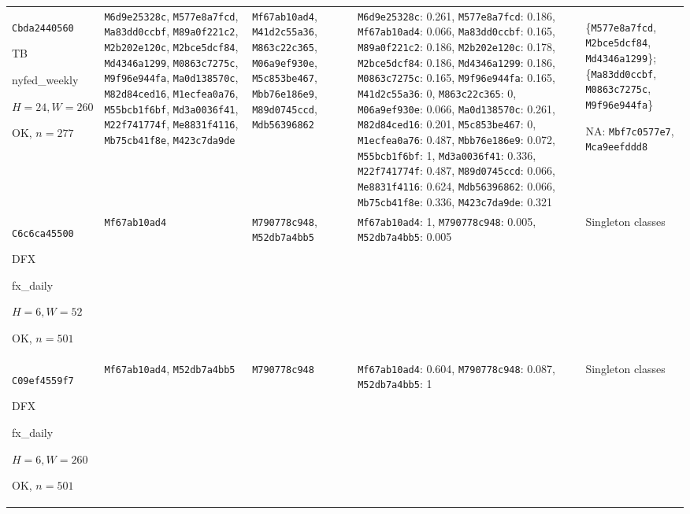 \begin{longtable}{p{.15\linewidth}p{.17\linewidth}p{.17\linewidth}p{.25\linewidth}p{.14\linewidth}}
\texttt{Cbda2440560}\par TB\par nyfed\_\allowbreak{}weekly\par $H=24,W=260$\par OK, $n=277$ & \texttt{M6d9e25328c}, \texttt{M577e8a7fcd}, \texttt{Ma83dd0ccbf}, \texttt{M89a0f221c2}, \texttt{M2b202e120c}, \texttt{M2bce5dcf84}, \texttt{Md4346a1299}, \texttt{M0863c7275c}, \texttt{M9f96e944fa}, \texttt{Ma0d138570c}, \texttt{M82d84ced16}, \texttt{M1ecfea0a76}, \texttt{M55bcb1f6bf}, \texttt{Md3a0036f41}, \texttt{M22f741774f}, \texttt{Me8831f4116}, \texttt{Mb75cb41f8e}, \texttt{M423c7da9de} & \texttt{Mf67ab10ad4}, \texttt{M41d2c55a36}, \texttt{M863c22c365}, \texttt{M06a9ef930e}, \texttt{M5c853be467}, \texttt{Mbb76e186e9}, \texttt{M89d0745ccd}, \texttt{Mdb56396862} & \texttt{M6d9e25328c}: 0.261, \texttt{M577e8a7fcd}: 0.186, \texttt{Mf67ab10ad4}: 0.066, \texttt{Ma83dd0ccbf}: 0.165, \texttt{M89a0f221c2}: 0.186, \texttt{M2b202e120c}: 0.178, \texttt{M2bce5dcf84}: 0.186, \texttt{Md4346a1299}: 0.186, \texttt{M0863c7275c}: 0.165, \texttt{M9f96e944fa}: 0.165, \texttt{M41d2c55a36}: 0, \texttt{M863c22c365}: 0, \texttt{M06a9ef930e}: 0.066, \texttt{Ma0d138570c}: 0.261, \texttt{M82d84ced16}: 0.201, \texttt{M5c853be467}: 0, \texttt{M1ecfea0a76}: 0.487, \texttt{Mbb76e186e9}: 0.072, \texttt{M55bcb1f6bf}: 1, \texttt{Md3a0036f41}: 0.336, \texttt{M22f741774f}: 0.487, \texttt{M89d0745ccd}: 0.066, \texttt{Me8831f4116}: 0.624, \texttt{Mdb56396862}: 0.066, \texttt{Mb75cb41f8e}: 0.336, \texttt{M423c7da9de}: 0.321 & \{\texttt{M577e8a7fcd}, \texttt{M2bce5dcf84}, \texttt{Md4346a1299}\}; \{\texttt{Ma83dd0ccbf}, \texttt{M0863c7275c}, \texttt{M9f96e944fa}\}\par NA: \texttt{Mbf7c0577e7}, \texttt{Mca9eefddd8} \\
\texttt{C6c6ca45500}\par DFX\par fx\_\allowbreak{}daily\par $H=6,W=52$\par OK, $n=501$ & \texttt{Mf67ab10ad4} & \texttt{M790778c948}, \texttt{M52db7a4bb5} & \texttt{Mf67ab10ad4}: 1, \texttt{M790778c948}: 0.005, \texttt{M52db7a4bb5}: 0.005 & Singleton classes \\
\texttt{C09ef4559f7}\par DFX\par fx\_\allowbreak{}daily\par $H=6,W=260$\par OK, $n=501$ & \texttt{Mf67ab10ad4}, \texttt{M52db7a4bb5} & \texttt{M790778c948} & \texttt{Mf67ab10ad4}: 0.604, \texttt{M790778c948}: 0.087, \texttt{M52db7a4bb5}: 1 & Singleton classes \\

\end{longtable}

